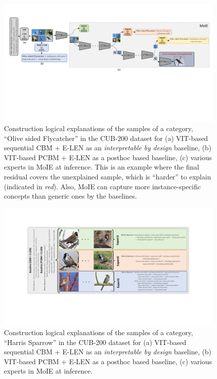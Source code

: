 \begin{figure}[t]
\centering
\includegraphics[width=1 \linewidth]{figures/Supp/Olive_sided.pdf}
\vspace{-10pt}
\caption{Construction logical explanations of the samples of a category, ``Olive sided Flycatcher'' in the CUB-200 dataset for (a) VIT-based sequential CBM + E-LEN as an \emph{interpretable by design} baseline, (b) VIT-based PCBM + E-LEN as a posthoc based baseline, (c) various experts in MoIE at inference. This is an example where the final residual covers the unexplained sample, which is ``harder'' to explain (indicated in \emph{red}). Also, MoIE can capture more instance-specific concepts than generic ones by the baselines.}
\label{fig:local_ex_cub_olive_sided}
\vspace{-2.5pt}
\end{figure}


\begin{figure}[h]
\centering
\includegraphics[width=1 \linewidth]{figures/Supp/Harris_sparrow.pdf}
\vspace{-10pt}
\caption{Construction logical explanations of the samples of a category, ``Harris Sparrow'' in the CUB-200 dataset for (a) VIT-based sequential CBM + E-LEN as an \emph{interpretable by design} baseline, (b) VIT-based PCBM + E-LEN as a posthoc based baseline, (c) various experts in MoIE at inference.}
\label{fig:local_ex_cub_harris}
\vspace{-2.5pt}
\end{figure}

